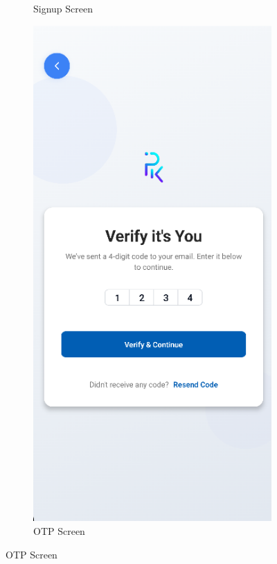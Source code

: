 \begin{figure}[htbp]
\begin{subfigure}[b]{0.25\textwidth}
        \caption{Signup Screen}
        \label{fig:mobile-signup}
    \end{subfigure}
    \hfill
    \begin{subfigure}[b]{0.25\textwidth}
        \centering
        \includegraphics[width=\textwidth]{images/mobile-auth-screen_otp.png}
        \caption{OTP Screen}
        \label{fig:mobile-otp}
    \end{subfigure}
    

\end{figure}
